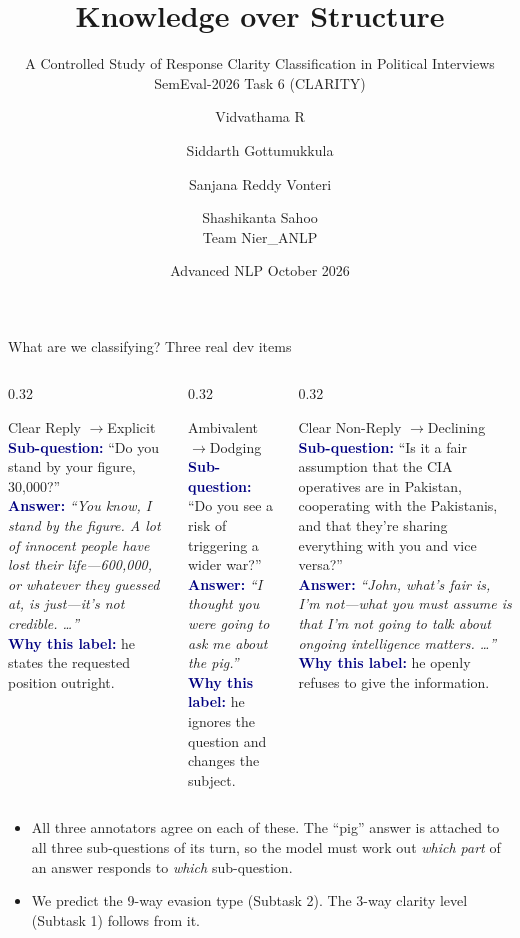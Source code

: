 \documentclass[aspectratio=169,10pt]{beamer}
\title[Knowledge over Structure]{Knowledge over Structure}
\subtitle{A Controlled Study of Response Clarity Classification in Political Interviews\\[2pt]
  \small SemEval-2026 Task 6 (CLARITY)}
\author[Team Nier\_ANLP]{Vidvathama R \and Siddarth Gottumukkula \and Sanjana Reddy Vonteri \and Shashikanta Sahoo\texorpdfstring{\\[2pt]\small Team Nier\_ANLP}{}}
\institute[IIIT Hyderabad]{International Institute of Information Technology, Hyderabad}
\date[October 2026]{Advanced NLP \quad\textbullet\quad October 2026}
\newcommand{\excard}[4]{%
  \begin{block}{#1}\scriptsize
    \textcolor{navy}{\textbf{Sub-question:}} #2\\[3pt]
    \textcolor{navy}{\textbf{Answer:}} \emph{#3}\\[3pt]
    \textcolor{navy}{\textbf{Why this label:}} #4
  \end{block}}
\begin{document}
\begin{frame}
  \titlepage
\end{frame}

\begin{frame}{What are we classifying? Three real dev items}
  \begin{columns}[T]
    \begin{column}{0.32\textwidth}
      \excard{Clear Reply \quad$\rightarrow$\quad Explicit}
        {``Do you stand by your figure, 30,000?''}
        {``You know, I stand by the figure. A lot of innocent people have lost their life---600,000, or whatever they guessed at, is just---it's not credible. \ldots''}
        {he states the requested position outright.}
    \end{column}
    \begin{column}{0.32\textwidth}
      \excard{Ambivalent \quad$\rightarrow$\quad Dodging}
        {``Do you see a risk of triggering a wider war?''}
        {``I thought you were going to ask me about the pig.''}
        {he ignores the question and changes the subject.}
    \end{column}
    \begin{column}{0.32\textwidth}
      \excard{Clear Non-Reply \quad$\rightarrow$\quad Declining}
        {``Is it a fair assumption that the CIA operatives are in Pakistan, cooperating with the Pakistanis, and that they're sharing everything with you and vice versa?''}
        {``John, what's fair is, I'm not---what you must assume is that I'm not going to talk about ongoing intelligence matters. \ldots''}
        {he openly refuses to give the information.}
    \end{column}
  \end{columns}
  \vspace{6pt}
  \begin{itemize}\small
    \item All three annotators agree on each of these. The ``pig'' answer is attached to all three sub-questions of its turn, so the model must work out \emph{which part} of an answer responds to \emph{which} sub-question.
    \item We predict the 9-way evasion type (Subtask 2). The 3-way clarity level (Subtask 1) follows from it.
  \end{itemize}
\end{frame}
\end{document}
